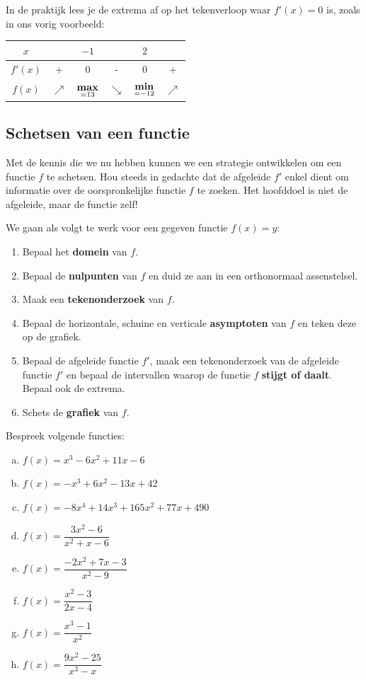 \documentclass[12pt]{article}
\begin{document}
In de praktijk lees je de extrema af op het tekenverloop waar $f'(x)=0$ is, zoals in ons vorig voorbeeld:

\begin{center}
  \begin{tabular}{c|ccccc}
    $x$ & \hspace*{1.0cm} & $-1$ & \hspace*{1.0cm} & $2$ & \hspace*{1.0cm}\\
    \hline
    $f'(x)$ & + & 0 & - & 0 & +\\
    \hline
    $f(x)$ & $\nearrow$ &  $\underset{=13}{\bf max}$ & $\searrow$ & $\underset{=-12}{\bf min}$ & $\nearrow$
  \end{tabular}
\end{center}

\subsection{Schetsen van een functie}

Met de kennis die we nu hebben kunnen we een strategie ontwikkelen om een functie $f$ te schetsen. Hou steeds in gedachte dat de afgeleide $f'$ enkel dient om informatie over de oorspronkelijke functie $f$ te zoeken. Het hoofddoel is niet de afgeleide, maar de functie zelf!

We gaan als volgt te werk voor een gegeven functie $f(x)=y$:
\begin{enumerate}
\item Bepaal het {\bf domein} van $f$.
\item Bepaal de {\bf nulpunten} van $f$ en duid ze aan in een orthonormaal assenstelsel.
\item Maak een {\bf tekenonderzoek} van $f$.
\item Bepaal de horizontale, schuine en verticale {\bf asymptoten} van $f$ en teken deze op de grafiek.
\item Bepaal de afgeleide functie $f'$, maak een tekenonderzoek van de afgeleide functie $f'$ en bepaal de intervallen waarop de functie $f$ {\bf stijgt of daalt}. Bepaal ook de extrema.
\item Schets de {\bf grafiek} van $f$.
\end{enumerate}

\begin{oefening}
  Bespreek volgende functies:
  \begin{enumerate}[(a)]
  \itemsep.75em
  \item $f(x)=x^3-6x^2+11x-6$
  \item $f(x)=-x^3+6x^2-13x+42$
  \item $f(x)=-8x^4+14x^3+165x^2+77x+490$
  \item $f(x)=\dfrac{3x^2-6}{x^2+x-6}$
  \item $f(x)=\dfrac{-2x^2+7x-3}{x^2-9}$
  \item $f(x)=\dfrac{x^2-3}{2x-4}$
  \item $f(x)=\dfrac{x^3-1}{x^2}$
  \item $f(x)=\dfrac{9x^2-25}{x^3-x}$
  \end{enumerate}
\end{oefening}
\end{document}

